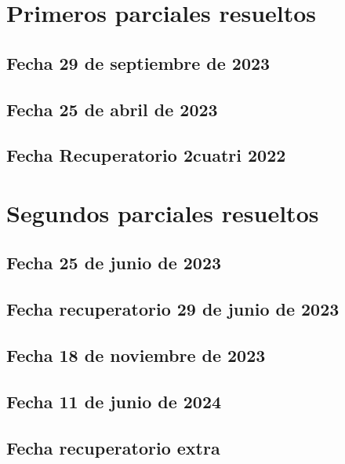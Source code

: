 \documentclass[10pt, a4paper]{report}
\begin{document}
    \chapter{Primeros parciales resueltos}
        \section{Fecha 29 de septiembre de 2023}
            

        \newpage
        \section{Fecha 25 de abril de 2023}
            

        \newpage
        \section{Fecha Recuperatorio 2cuatri 2022}
            


        \newpage
    \chapter{Segundos parciales resueltos}
        \section{Fecha 25 de junio de 2023}
            

        \newpage
        \section{Fecha recuperatorio 29 de junio de 2023}
            

        \newpage
        \section{Fecha 18 de noviembre de 2023}
            

        \newpage
        \section{Fecha 11 de junio de 2024}
            

        \newpage
        \section{Fecha recuperatorio extra}
            
    
\end{document}
